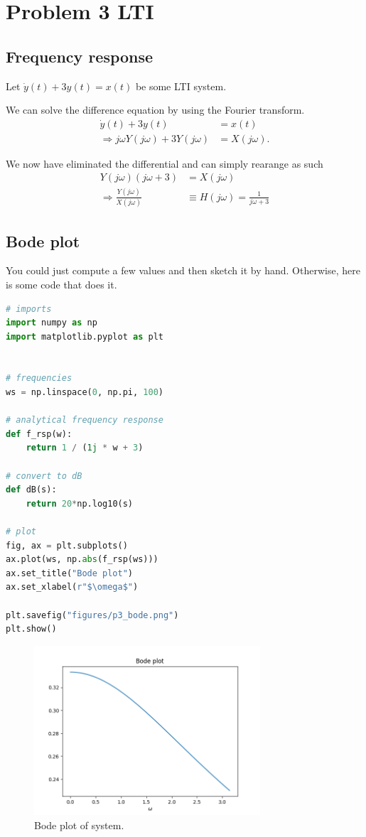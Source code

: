 \section*{Problem 3 LTI}
\subsection*{Frequency response}
Let $\dot{y}(t) + 3y(t) = x(t)$ be some LTI system.

We can solve the difference equation by using the Fourier transform.
\begin{align}
    \dot{y}(t) + 3y(t) &= x(t)\\
\Rightarrow j\omega Y(j\omega) + 3Y(j\omega) &= X(j\omega).
\end{align}

We now have eliminated the differential and can simply rearange as such
\begin{align}
   Y(j\omega)(j\omega  + 3) &= X(j\omega)\\ 
\Rightarrow \frac{Y(j\omega)}{X(j\omega)} &\equiv H(j\omega) = \frac{1}{j\omega + 3}
\end{align}

\subsection*{Bode plot}
You could just compute a few values and then sketch it by hand. Otherwise, here
is some code that does it.

\begin{lstlisting}[language=python]
# imports
import numpy as np
import matplotlib.pyplot as plt


# frequencies
ws = np.linspace(0, np.pi, 100)

# analytical frequency response
def f_rsp(w):
    return 1 / (1j * w + 3)
    
# convert to dB
def dB(s):
    return 20*np.log10(s)

# plot
fig, ax = plt.subplots()
ax.plot(ws, np.abs(f_rsp(ws)))
ax.set_title("Bode plot")
ax.set_xlabel(r"$\omega$")

plt.savefig("figures/p3_bode.png")
plt.show()
\end{lstlisting}

\begin{figure}[h!]
    \begin{center}
        \includegraphics[width=0.75\textwidth]{figures/p3_bode.png}
    \end{center}
    \caption{Bode plot of system.}
\end{figure}

